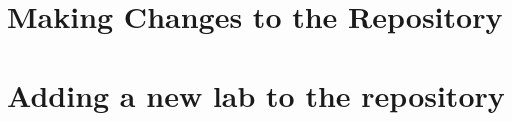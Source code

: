 \documentclass[justified]{article}
\begin{document}
\section{Making Changes to the Repository}



\section{Adding a new lab to the repository}



\end{document}
